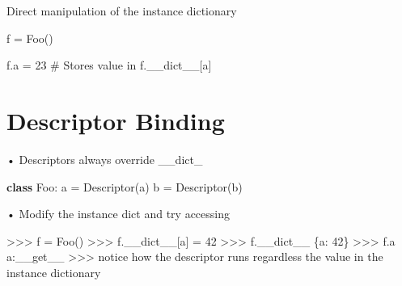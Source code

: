 \documentclass[
  letterpaper,
  DIV=11,
  numbers=noendperiod]{scrreprt}
\newenvironment{Shaded}{\begin{snugshade}}{\end{snugshade}}
\newcommand{\CommentTok}[1]{\textcolor[rgb]{0.37,0.37,0.37}{#1}}
\newcommand{\DecValTok}[1]{\textcolor[rgb]{0.68,0.00,0.00}{#1}}
\newcommand{\KeywordTok}[1]{\textcolor[rgb]{0.00,0.23,0.31}{\textbf{#1}}}
\newcommand{\NormalTok}[1]{\textcolor[rgb]{0.00,0.23,0.31}{#1}}
\newcommand{\OperatorTok}[1]{\textcolor[rgb]{0.37,0.37,0.37}{#1}}
\newcommand{\StringTok}[1]{\textcolor[rgb]{0.13,0.47,0.30}{#1}}
\begin{document}
Direct manipulation of the instance dictionary

\begin{Shaded}
\begin{Highlighting}[]
\NormalTok{f = Foo() }
\end{Highlighting}
\end{Shaded}

\begin{Shaded}
\begin{Highlighting}[]
\NormalTok{f.a }\OperatorTok{=} \DecValTok{23} \CommentTok{\# Stores value in f.\_\_dict\_\_[\textquotesingle{}a\textquotesingle{}] }
\end{Highlighting}
\end{Shaded}


\chapter{Descriptor Binding}\label{descriptor-binding}

• Descriptors always override \_\_dict\_

\begin{Shaded}
\begin{Highlighting}[]
\KeywordTok{class}\NormalTok{ Foo:  }
\NormalTok{    a }\OperatorTok{=}\NormalTok{ Descriptor(}\StringTok{\textquotesingle{}a\textquotesingle{}}\NormalTok{)  }
\NormalTok{    b }\OperatorTok{=}\NormalTok{ Descriptor(}\StringTok{\textquotesingle{}b\textquotesingle{}}\NormalTok{) }
\end{Highlighting}
\end{Shaded}

• Modify the instance dict and try accessing

\begin{Shaded}
\begin{Highlighting}[]
\NormalTok{\textgreater{}\textgreater{}\textgreater{} f = Foo()}
\NormalTok{\textgreater{}\textgreater{}\textgreater{} f.\_\_dict\_\_[\textquotesingle{}a\textquotesingle{}] = 42}
\NormalTok{\textgreater{}\textgreater{}\textgreater{} f.\_\_dict\_\_}
\NormalTok{\{\textquotesingle{}a\textquotesingle{}: 42\}}
\NormalTok{\textgreater{}\textgreater{}\textgreater{} f.a}
\NormalTok{a:\_\_get\_\_}
\NormalTok{\textgreater{}\textgreater{}\textgreater{} notice how the descriptor runs regardless}
\NormalTok{the value in the instance dictionary }
\end{Highlighting}
\end{Shaded}
\end{document}

